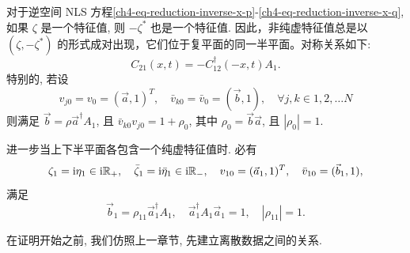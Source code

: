 \fi
\begin{theorem}[逆空间] \label{ch4-thm:inverse-space}
    对于逆空间 NLS 方程\eqref{ch4-eq-reduction-inverse-x-p}-\eqref{ch4-eq-reduction-inverse-x-q}, 如果 $ \zeta $ 是一个特征值, 则 $ -\zeta^{*} $ 也是一个特征值. 因此，非纯虚特征值总是以 $ (\zeta, -\zeta^{*}) $ 的形式成对出现，它们位于复平面的同一半平面。对称关系如下:
    \begin{equation}
        C_{21}(x,t) = - C_{12}^{\dagger}(-x,t) A_{1}.
    \end{equation}
    特别的, 若设
    \begin{equation}
        v_{j0} = v_{0} = (\vec{a}, 1)^{T}, \quad \bar{v}_{k0} = \bar{v}_{0} = (\vec{b}, 1), \quad \forall j, k \in 1, 2, \dots N
    \end{equation}
    则满足 $\vec{b} = \rho \vec{a}^{\dagger} A_{1}$, 且 $\bar{v}_{k0} v_{j0} = 1 + \rho_{0}$, 其中 $\rho_{0} = \vec{b} \vec{a}$, 且 $|\rho_{0}| = 1$.

    进一步当上下半平面各包含一个纯虚特征值时. 必有
    \begin{equation}
        \zeta_{1} = \mathrm{i} \eta_{1} \in \mathrm{i} \mathbb{R}_{+}, \quad \bar{\zeta}_{1} = \mathrm{i} \bar{\eta}_{1} \in \mathrm{i} \mathbb{R}_{-}, \quad v_{10} = (\vec{a}_{1}, 1)^{T}, \quad \bar{v}_{10} = (\vec{b}_{1}, 1),
    \end{equation}
    满足
    \begin{equation}
        \vec{b}_{1} = \rho_{11} \vec{a}_{1}^{\dagger} A_{1}, \quad \vec{a}_{1}^{\dagger} A_{1} \vec{a}_{1} = 1, \quad |\rho_{11}| = 1.
    \end{equation}
\end{theorem}
在证明开始之前, 我们仿照上一章节, 先建立离散数据之间的关系.

